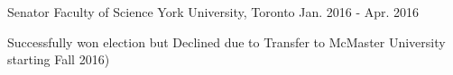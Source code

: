 \begin{cventries}

  \cventry
    {Senator} %
    {Faculty of Science} %
    {York University, Toronto} %
    {Jan. 2016 - Apr. 2016} %
    {
      \begin{cvitems} %
        \item Successfully won election but Declined due to Transfer to McMaster University starting Fall 2016)
      \end{cvitems}
    }


\end{cventries}
